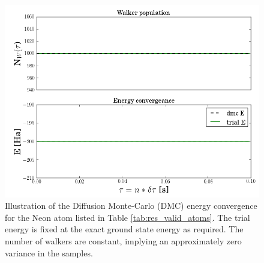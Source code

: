 \begin{figure}[h]
 \begin{center}
  \includegraphics[scale=0.5]{../Graphics/DMC_neon_valid.png}
  \caption{Illustration of the Diffusion Monte-Carlo (DMC) energy convergence for the Neon atom listed in Table \ref{tab:res_valid_atoms}. The trial energy is fixed at the exact ground state energy as required. The number of walkers are constant, implying an approximately zero variance in the samples.}
  \label{fig:DMC_neon_nonint}
 \end{center}
\end{figure}

